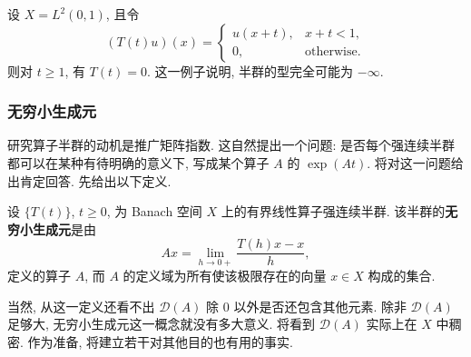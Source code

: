 \begin{Example}
\label{ex:absorbing-translation-minus-infinite-type}
设 $X=L^2(0,1)$, 且令
\begin{equation}\label{eq:finite-interval-absorbing-translation-semigroup}
(T(t)u)(x)=\begin{cases}u(x+t),&x+t<1,\\0,&\text{otherwise}.\end{cases}
\end{equation}
则对 $t\geq1$, 有 $T(t)=0$. 这一例子说明, 半群的型完全可能为 $-\infty$.
\end{Example}

\subsubsection{无穷小生成元}\label{subsec:semigroup-infinitesimal-generator}

研究算子半群的动机是推广矩阵指数. 这自然提出一个问题: 是否每个强连续半群都可以在某种有待明确的意义下, 写成某个算子 $A$ 的 $\exp(At)$. 将对这一问题给出肯定回答. 先给出以下定义.

\begin{Definition}
\label{def:semigroup-infinitesimal-generator}
设 $\{T(t)\}$, $t\geq0$, 为 Banach 空间 $X$ 上的有界线性算子强连续半群. 该半群的\textbf{无穷小生成元}是由
\begin{equation}\label{eq:semigroup-infinitesimal-generator-definition}
Ax=\lim_{h\to0+}\dfrac{T(h)x-x}{h},
\end{equation}
定义的算子 $A$, 而 $A$ 的定义域为所有使该极限存在的向量 $x\in X$ 构成的集合.
\end{Definition}

当然, 从这一定义还看不出 $\mathcal{D}(A)$ 除 0 以外是否还包含其他元素. 除非 $\mathcal{D}(A)$ 足够大, 无穷小生成元这一概念就没有多大意义. 将看到 $\mathcal{D}(A)$ 实际上在 $X$ 中稠密. 作为准备, 将建立若干对其他目的也有用的事实.

